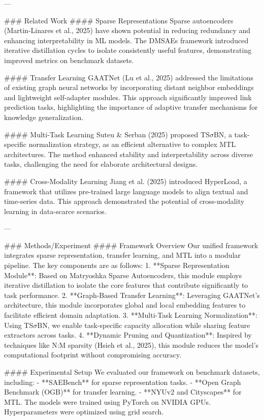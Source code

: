 ---

### Related Work
#### Sparse Representations
Sparse autoencoders (Martin-Linares et al., 2025) have shown potential in reducing redundancy and enhancing interpretability in ML models. The DMSAEs framework introduced iterative distillation cycles to isolate consistently useful features, demonstrating improved metrics on benchmark datasets.

#### Transfer Learning
GAATNet (Lu et al., 2025) addressed the limitations of existing graph neural networks by incorporating distant neighbor embeddings and lightweight self-adapter modules. This approach significantly improved link prediction tasks, highlighting the importance of adaptive transfer mechanisms for knowledge generalization.

#### Multi-Task Learning
Suteu & Serban (2025) proposed TS$σ$BN, a task-specific normalization strategy, as an efficient alternative to complex MTL architectures. The method enhanced stability and interpretability across diverse tasks, challenging the need for elaborate architectural designs.

#### Cross-Modality Learning
Jiang et al. (2025) introduced HyperLoad, a framework that utilizes pre-trained large language models to align textual and time-series data. This approach demonstrated the potential of cross-modality learning in data-scarce scenarios.

---

### Methods/Experiment
#### Framework Overview
Our unified framework integrates sparse representation, transfer learning, and MTL into a modular pipeline. The key components are as follows:
1. **Sparse Representation Module**: Based on Matryoshka Sparse Autoencoders, this module employs iterative distillation to isolate the core features that contribute significantly to task performance.
2. **Graph-Based Transfer Learning**: Leveraging GAATNet's architecture, this module incorporates global and local embedding features to facilitate efficient domain adaptation.
3. **Multi-Task Learning Normalization**: Using TS$σ$BN, we enable task-specific capacity allocation while sharing feature extractors across tasks.
4. **Dynamic Pruning and Quantization**: Inspired by techniques like N:M sparsity (Hsieh et al., 2025), this module reduces the model's computational footprint without compromising accuracy.

#### Experimental Setup
We evaluated our framework on benchmark datasets, including:
- **SAEBench** for sparse representation tasks.
- **Open Graph Benchmark (OGB)** for transfer learning.
- **NYUv2 and Cityscapes** for MTL.
The models were trained using PyTorch on NVIDIA GPUs. Hyperparameters were optimized using grid search.

